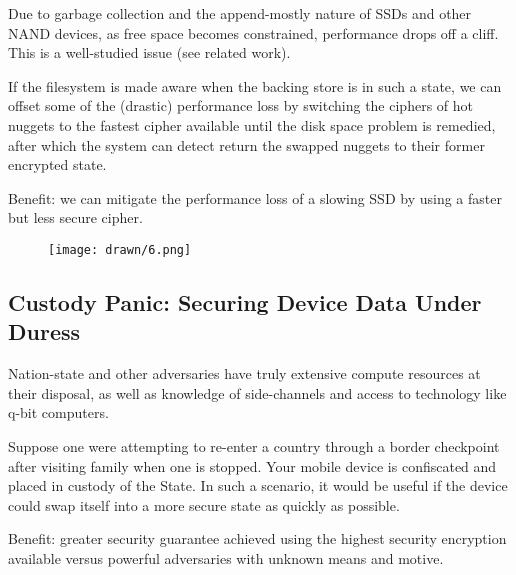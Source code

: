 Due to garbage collection and the append-mostly nature of SSDs and other NAND
devices, as free space becomes constrained, performance drops off a cliff. This
is a well-studied issue (see related work).

If the filesystem is made aware when the backing store is in such a state, we
can offset some of the (drastic) performance loss by switching the ciphers of hot
nuggets to the fastest cipher available until the disk space problem is
remedied, after which the system can detect return the swapped nuggets to their
former encrypted state.

Benefit: we can mitigate the performance loss of a slowing SSD by using a faster
but less secure cipher.

\begin{figure}[ht]
 \centering
  \texttt{[image: drawn/6.png]}
   \caption{}\label{fig:eol}
\end{figure}

\subsection{Custody Panic: Securing Device Data Under Duress}

Nation-state and other adversaries have truly extensive compute resources at
their disposal, as well as knowledge of side-channels and access to technology
like q-bit computers.

Suppose one were attempting to re-enter a country through a border checkpoint
after visiting family when one is stopped. Your mobile device is confiscated and
placed in custody of the State. In such a scenario, it would be useful if the
device could swap itself into a more secure state as quickly as possible.

Benefit: greater security guarantee achieved using the highest security
encryption available versus powerful adversaries with unknown means and motive.


